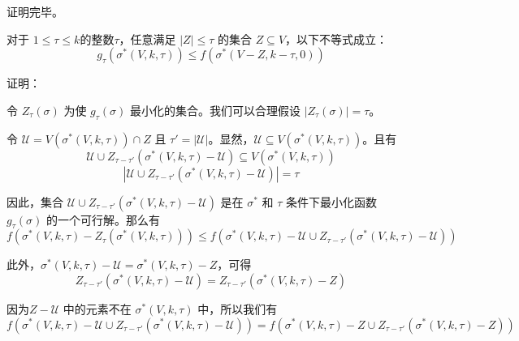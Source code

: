 \noindent 证明完毕。

\begin{lemma}
\label{lem:lem3}
对于 $1 \le \tau \le k$的整数$\tau$，任意满足 $|Z| \le \tau$ 的集合 $Z \subseteq V$，以下不等式成立：
\begin{equation}
g_\tau (\sigma^*(V,k,\tau)) \le f(\sigma^*(V-Z,k-\tau,0))
\end{equation}

\end{lemma}

\noindent 证明：

令 $Z_{\tau}(\sigma)$ 为使 $g_{\tau}(\sigma)$ 最小化的集合。我们可以合理假设 $|Z_{\tau}(\sigma)|=\tau$。

令 $\mathcal{U}=V(\sigma^*(V,k,\tau)) \cap Z$ 且 $\tau'=|\mathcal{U}|$。显然，$\mathcal{U}\subseteq V(\sigma^*(V,k,\tau))$。且有
\begin{equation}
\mathcal{U} \cup Z_{\tau-\tau'}(\sigma^*(V,k,\tau)-\mathcal{U}) \subseteq V(\sigma^*(V,k,\tau)) 
\end{equation}
\begin{equation}
|\mathcal{U} \cup Z_{\tau-\tau'}(\sigma^*(V,k,\tau)-\mathcal{U})| =\tau
\end{equation}

因此，集合 $\mathcal{U} \cup Z_{\tau-\tau'}(\sigma^*(V,k,\tau)-\mathcal{U})$ 是在 $\sigma^*$ 和 $\tau$ 条件下最小化函数 $g_\tau(\sigma)$ 的一个可行解。那么有
\begin{equation}
    f(\sigma^*(V,k,\tau) -Z_\tau(\sigma^*(V,k,\tau))) \le f(\sigma^*(V,k,\tau) - \mathcal{U} \cup Z_{\tau-\tau'}(\sigma^*(V,k,\tau)-\mathcal{U}))
\end{equation}

此外，$\sigma^*(V,k,\tau)-\mathcal{U} = \sigma^*(V,k,\tau) - Z$，可得
\begin{equation}
Z_{\tau-\tau'}(\sigma^*(V,k,\tau) - \mathcal{U}) = Z_{\tau-\tau'}(\sigma^*(V,k,\tau) - Z)
\end{equation}

因为$Z-\mathcal{U}$ 中的元素不在 $\sigma^*(V,k,\tau)$ 中，所以我们有
\begin{equation}
    f( \sigma^*(V,k,\tau) - \mathcal{U} \cup Z_{\tau-\tau'}(\sigma^*(V,k,\tau) - \mathcal{U}) ) = f( \sigma^*(V,k,\tau) - Z \cup Z_{\tau-\tau'}(\sigma^*(V,k,\tau) - Z))
\end{equation}

